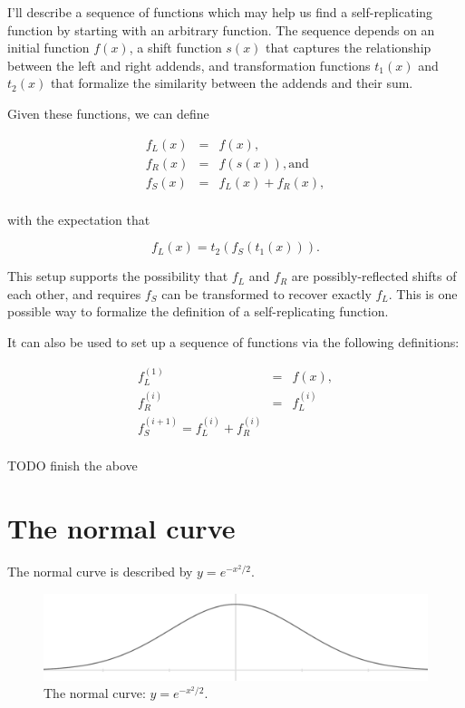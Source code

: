 \documentclass[]{article}
\begin{document}
I'll describe a sequence of functions which may help us find a
self-replicating function by starting with an arbitrary function. The
sequence depends on an initial function \(f(x)\), a shift function
\(s(x)\) that captures the relationship between the left and right
addends, and transformation functions \(t_1(x)\) and \(t_2(x)\) that
formalize the similarity between the addends and their sum.

Given these functions, we can define

\[\begin{array}{rcl}
  f_L(x) & = & f(x), \\
  f_R(x) & = & f(s(x)), \text{and} \\
  f_S(x) & = & f_L(x) + f_R(x), \\
\end{array}\]

with the expectation that

\[f_L(x) = t_2(f_S(t_1(x))).\]

This setup supports the possibility that \(f_L\) and \(f_R\) are
possibly-reflected shifts of each other, and requires \(f_S\) can be
transformed to recover exactly \(f_L\). This is one possible way to
formalize the definition of a self-replicating function.

It can also be used to set up a sequence of functions via the following
definitions:

\[\begin{array}{rcl}
  f^{(1)}_L & = & f(x), \\
  f^{(i)}_R & = & f^{(i)}_L \\
  f^{(i+1)}_S = f^{(i)}_L + f^{(i)}_R \\
\end{array}\]

TODO finish the above

\section{The normal curve}\label{the-normal-curve}

The normal curve is described by \(y = e^{-x^2/2}\).

\begin{figure}[htbp]
\centering
\includegraphics{images/pdfs/normal3.pdf}
\caption{The normal curve: \(y=e^{-x^2/2}\).}
\end{figure}
\end{document}
